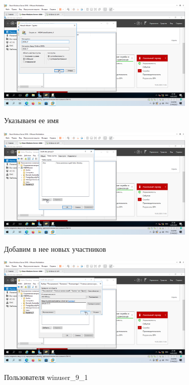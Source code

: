 \documentclass[a4paper]{article}
\begin{document}
  \begin{figure}[H]
    \centering
    \includegraphics[width=0.85\textwidth]{5_0156}
    \label{img:156}
    \caption{Указываем ее имя}
  \end{figure}

  \begin{figure}[H]
    \centering
    \includegraphics[width=0.85\textwidth]{5_0157}
    \label{img:157}
    \caption{Добавим в нее новых участников}
  \end{figure}

  \begin{figure}[H]
    \centering
    \includegraphics[width=0.85\textwidth]{5_0158}
    \label{img:158}
    \caption{Пользователя winuser\_9\_1}
  \end{figure}
\end{document}
